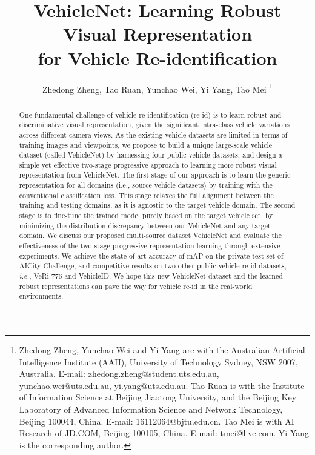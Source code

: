 \documentclass[journal]{IEEEtran}
\def\ie{\emph{i.e.}}
\begin{document}
\title{VehicleNet: Learning Robust Visual Representation \\ 
for Vehicle Re-identification}
\author{Zhedong Zheng, Tao Ruan, Yunchao Wei, Yi Yang, Tao Mei
\thanks{Zhedong Zheng, Yunchao Wei and Yi Yang are with the Australian Artificial Intelligence Institute (AAII), University of Technology Sydney, NSW 2007, Australia. E-mail: zhedong.zheng@student.uts.edu.au, yunchao.wei@uts.edu.au, yi.yang@uts.edu.au. Tao Ruan is with the Institute of Information Science at Beijing Jiaotong University, and the Beijing Key Laboratory of Advanced Information Science and Network Technology, Beijing 100044, China. E-mail: 16112064@bjtu.edu.cn. Tao Mei is with AI Research of JD.COM, Beijing 100105, China. E-mail: tmei@live.com. 
Yi Yang is the corresponding author.}
}


\maketitle

\begin{abstract}

One fundamental challenge of vehicle re-identification (re-id) is to learn robust and discriminative visual representation, given the significant intra-class vehicle variations across different camera views.
As the existing vehicle datasets are limited in terms of training images and viewpoints, we propose to build a unique large-scale vehicle dataset (called VehicleNet) by harnessing four public vehicle datasets, and design a simple yet effective two-stage progressive approach to learning more robust visual representation from VehicleNet.
The first stage of our approach is to learn the generic representation for all domains (i.e., source vehicle datasets) by training with the conventional classification loss. This stage relaxes the full alignment between the training and testing domains, as it is agnostic to the target vehicle domain. The second stage is to fine-tune the trained model purely based on the target vehicle set, by minimizing the distribution discrepancy between our VehicleNet and any target domain. We discuss our proposed multi-source dataset VehicleNet and evaluate the effectiveness of the two-stage progressive representation learning through extensive experiments.
We achieve the state-of-art accuracy of  mAP on the private test set of AICity Challenge, and competitive results on two other public vehicle re-id datasets, \ie, VeRi-776 and VehicleID. We hope this new VehicleNet dataset and the learned robust representations can pave the way for vehicle re-id in the real-world environments. 
\end{abstract}
\end{document}
